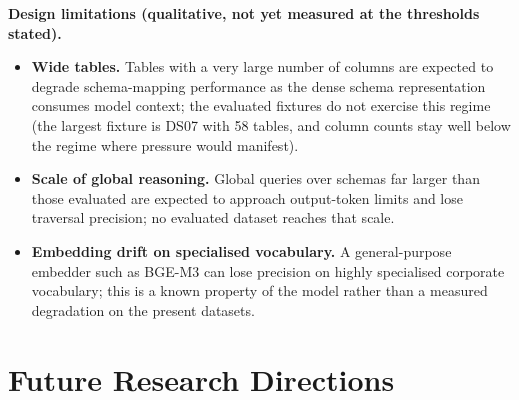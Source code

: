 \textbf{Design limitations (qualitative, not yet measured at the thresholds stated).}
\begin{itemize}
    \item \textbf{Wide tables.} Tables with a very large number of columns are expected to degrade schema-mapping performance as the dense schema representation consumes model context; the evaluated fixtures do not exercise this regime (the largest fixture is DS07 with 58 tables, and column counts stay well below the regime where pressure would manifest).
    \item \textbf{Scale of global reasoning.} Global queries over schemas far larger than those evaluated are expected to approach output-token limits and lose traversal precision; no evaluated dataset reaches that scale.
    \item \textbf{Embedding drift on specialised vocabulary.} A general-purpose embedder such as BGE-M3 can lose precision on highly specialised corporate vocabulary; this is a known property of the model rather than a measured degradation on the present datasets.
\end{itemize}

\section{Future Research Directions}
\label{sec:conclusion:future_work}

